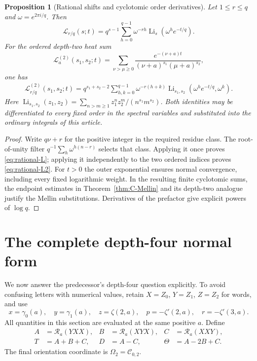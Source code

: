 \documentclass[11pt]{article}
\numberwithin{equation}{section}
\newtheorem{proposition}[theorem]{Proposition}
\theoremstyle{definition}
\newcommand{\R}{\mathcal R}
\newcommand{\Li}{\operatorname{Li}}
\begin{document}
\begin{proposition}[Rational shifts and cyclotomic order derivatives]
\label{prop:cyclotomic}
Let $1\le r\le q$ and $\omega=e^{2\pi i/q}$. Then
\begin{equation}\label{eq:rational-L}
 \mathcal L_{r/q}(s;t)=q^{s-1}\sum_{h=0}^{q-1}
               \omega^{-rh}\Li_s(\omega^h e^{-t/q}).
\end{equation}
For the ordered depth-two heat sum
\begin{equation}\label{eq:L2-def}
 \mathcal L_a^{(2)}(s_1,s_2;t)=
 \sum_{\nu>\mu\ge0}\frac{e^{-(\nu+a)t}}
                        {(\nu+a)^{s_1}(\mu+a)^{s_2}},
\end{equation}
one has
\begin{align}\label{eq:rational-L2}
 \mathcal L_{r/q}^{(2)}(s_1,s_2;t)
 =q^{s_1+s_2-2}\sum_{h,k=0}^{q-1}\omega^{-r(h+k)}
       \Li_{s_1,s_2}(\omega^h e^{-t/q},\omega^k).
\end{align}
Here $\Li_{s_1,s_2}(z_1,z_2)=\sum_{n>m\ge1}z_1^nz_2^m/(n^{s_1}m^{s_2})$.
Both identities may be differentiated to every fixed order in the spectral
variables and substituted into the ordinary integrals of this article.
\end{proposition}
\begin{proof}
Write $q\nu+r$ for the positive integer in the required residue class.
The root-of-unity filter
$q^{-1}\sum_h\omega^{h(n-r)}$ selects that class. Applying it once
proves \eqref{eq:rational-L}; applying it independently to the two
ordered indices proves \eqref{eq:rational-L2}. For $t>0$ the outer
exponential ensures normal convergence, including every fixed logarithmic
weight. In the resulting finite cyclotomic sums, the endpoint estimates
in Theorem~\ref{thm:C-Mellin} and its depth-two analogue justify the
Mellin substitutions. Derivatives of the prefactor give explicit powers
of $\log q$.
\end{proof}

\section{The complete depth-four normal form}
\label{sec:quartic}
We now answer the predecessor's depth-four question explicitly. To avoid
confusing letters with numerical values, retain $X=Z_0$, $Y=Z_1$,
$Z=Z_2$ for words, and use
\begin{equation}\label{eq:quartic-data}
 x=\gamma_0(a),\quad y=\gamma_1(a),\quad
 z=\zeta(2,a),\quad p=-\zeta'(2,a),\quad r=-\zeta'(3,a).
\end{equation}
All quantities in this section are evaluated at the same positive $a$.
Define
\begin{align}
 A&=\R_a(YXX),&B&=\R_a(XYX),&C&=\R_a(XXY),\label{eq:ABC}\\
 T&=A+B+C,&D&=A-C,&\Theta&=A-2B+C.\label{eq:T-D-Theta}
\end{align}
The final orientation coordinate is $\Omega_2=\mathcal C_{0,2}$.
\end{document}
